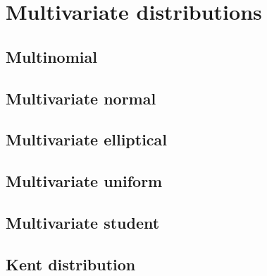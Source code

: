 % 	
%
%
%


\chapter{Multivariate distributions}

\section{Multinomial}
\section{Multivariate normal}
\section{Multivariate elliptical}
\section{Multivariate uniform}
\section{Multivariate student}
\section{Kent distribution}

